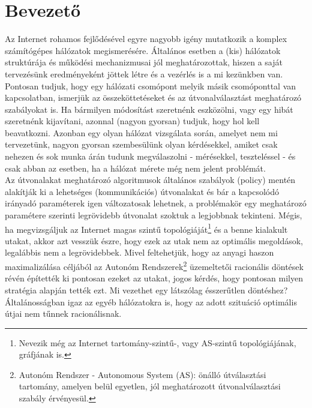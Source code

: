 \chapter*{Bevezető}

Az Internet rohamos fejlődésével egyre nagyobb igény mutatkozik a komplex számítógépes hálózatok megismerésére. Általános esetben a (kis) hálózatok struktúrája és működési mechanizmusai jól meghatározottak, hiszen a saját tervezésünk eredményeként jöttek létre és a vezérlés is a mi kezünkben van. Pontosan tudjuk, hogy egy hálózati csomópont melyik másik csomóponttal van kapcsolatban, ismerjük az összeköttetéseket és az útvonalválasztást meghatározó szabályokat is. Ha bármilyen módosítást szeretnénk eszközölni, vagy egy hibát szeretnénk kijavítani, azonnal (nagyon gyorsan) tudjuk, hogy hol kell beavatkozni.
Azonban egy olyan hálózat vizsgálata során, amelyet nem mi tervezetünk, nagyon gyorsan szembesülünk olyan kérdésekkel, amiket csak nehezen és sok munka árán tudunk megválaszolni - mérésekkel, teszteléssel - és csak abban az esetben, ha a hálózat mérete még nem jelent problémát.\\

Az útvonalakat meghatározó algoritmusok általános szabályok (policy) mentén alakítják ki a lehetséges (kommunikációs) útvonalakat és bár a kapcsolódó irányadó paraméterek igen változatosak lehetnek, a problémakör egy meghatározó paramétere szerinti legrövidebb útvonalat szoktuk a legjobbnak tekinteni. Mégis, ha megvizsgáljuk az Internet magas szintű topológiáját\footnote{Nevezik még az Internet tartomány-szintű-, vagy AS-szintű topológiájának, gráfjának is.} és a benne kialakult utakat, akkor azt vesszük észre, hogy ezek az utak nem az optimális megoldások, legalábbis nem a legrövidebbek. Mivel feltehetjük, hogy az anyagi haszon maximalizálása céljából az Autonóm Rendszerek\footnote{Autonóm Rendszer - Autonomous System (AS): önálló útválasztási tartomány, amelyen belül egyetlen, jól meghatározott útvonalválasztási szabály érvényesül.} üzemeltetői racionális döntések révén építették ki pontosan ezeket az utakat, jogos kérdés, hogy pontosan milyen stratégia alapján tették ezt. Mi vezethet egy látszólag ésszerűtlen döntéshez? Általánosságban igaz az egyéb hálózatokra is, hogy az adott szituáció optimális útjai nem tűnnek racionálisnak.\\

